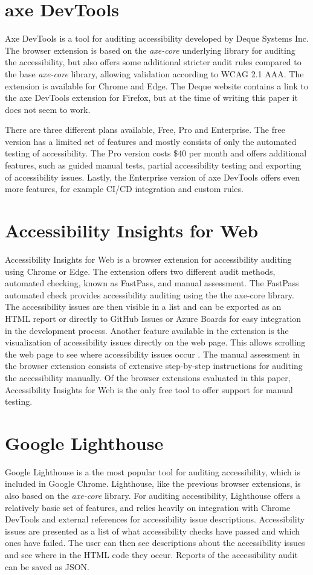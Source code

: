 \section{axe DevTools}
Axe DevTools is a tool for auditing accessibility developed by Deque Systems Inc.
The browser extension is based on the \emph{axe-core} underlying library for auditing the accessibility, but also offers some additional stricter audit rules compared to the base \emph{axe-core} library, allowing validation according to WCAG 2.1 AAA.
The extension is available for Chrome and Edge.
The Deque website contains a link to the axe DevTools extension for Firefox, but at the time of writing this paper it does not seem to work.

There are three different plans available, Free, Pro and Enterprise.
The free version has a limited set of features and mostly consists of only the automated testing of accessibility.
The Pro version costs \$40 per month and offers additional features, such as guided manual tests, partial accessibility testing and exporting of accessibility issues.
Lastly, the Enterprise version of axe DevTools offers even more features, for example CI/CD integration and custom rules.


\section{Accessibility Insights for Web}
Accessibility Insights for Web is a browser extension for accessibility auditing using Chrome or Edge.
The extension offers two different audit methods, automated checking, known as FastPass, and manual assessment.
The FastPass automated check provides accessibility auditing using the the axe-core library.
The accessibility issues are then visible in a list and can be exported as an HTML report or directly to GitHub Issues or Azure Boards for easy integration in the development process.
Another feature available in the extension is the visualization of accessibility issues directly on the web page.
This allows scrolling the web page to see where accessibility issues occur .
The manual assessment in the browser extension consists of extensive step-by-step instructions for auditing the accessibility manually.
Of the browser extensions evaluated in this paper, Accessibility Insights for Web is the only free tool to offer support for manual testing.


\section{Google Lighthouse}
Google Lighthouse is a the most popular tool for auditing accessibility, which is included in Google Chrome.
Lighthouse, like the previous browser extensions, is also based on the \emph{axe-core} library.
For auditing accessibility, Lighthouse offers a relatively basic set of features, and relies heavily on integration with Chrome DevTools and external references for accessibility issue descriptions.
Accessibility issues are presented as a list of what accessibility checks have passed and which ones have failed.
The user can then see descriptions about the accessibility issues and see where in the HTML code they occur.
Reports of the accessibility audit can be saved as JSON.

